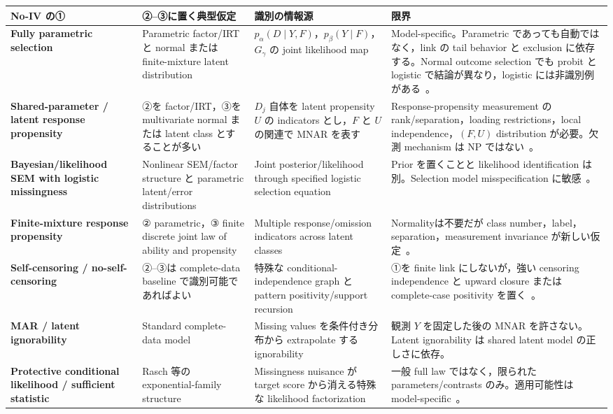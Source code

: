 \documentclass[11pt,a4paper]{ltjsarticle}
\theoremstyle{remark}
\begin{document}
\begin{center}
\footnotesize
\begin{tabularx}{0.99\textwidth}{>{\bfseries}p{32mm}p{37mm}p{42mm}X}
\toprule
No-IV の① & ②--③に置く典型仮定 & 識別の情報源 & 限界\\
\midrule
Fully parametric selection
& Parametric factor/IRT と normal または finite-mixture latent distribution
& $p_\alpha(D\mid Y,F)$，$p_\beta(Y\mid F)$，$G_\gamma$ の joint likelihood map
& Model-specific。Parametric であっても自動ではなく，link の tail behavior と exclusion に依存する。Normal outcome selection でも probit と logistic で結論が異なり，logistic には非識別例がある~\cite{MiaoDingGeng2016}。\\
\addlinespace
Shared-parameter / latent response propensity
& ②を factor/IRT，③を multivariate normal または latent class とすることが多い
& $D_j$ 自体を latent propensity $U$ の indicators とし，$F$ と $U$ の関連で MNAR を表す
& Response-propensity measurement の rank/separation，loading restrictions，local independence，$(F,U)$ distribution が必要。欠測 mechanism は NP ではない~\cite{MuthenKaplanHollis1987,HolmanGlas2005,RoseVonDavierXu2010,RoseVonDavierNagengast2017,KuhaKatsikatsouMoustaki2018}。\\
\addlinespace
Bayesian/likelihood SEM with logistic missingness
& Nonlinear SEM/factor structure と parametric latent/error distributions
& Joint posterior/likelihood through specified logistic selection equation
& Prior を置くことと likelihood identification は別。Selection model misspecification に敏感~\cite{Lee2006}。\\
\addlinespace
Finite-mixture response propensity
& ② parametric，③ finite discrete joint law of ability and propensity
& Multiple response/omission indicators across latent classes
& Normalityは不要だが class number，label，separation，measurement invariance が新しい仮定~\cite{BacciBartolucci2015}。\\
\addlinespace
Self-censoring / no-self-censoring
& ②--③は complete-data baseline で識別可能であればよい
& 特殊な conditional-independence graph と pattern positivity/support recursion
& ①を finite link にしないが，強い censoring independence と upward closure または complete-case positivity を置く~\cite{LiMiaoShpitserTT2023,Malinsky2022}。\\
\addlinespace
MAR / latent ignorability
& Standard complete-data model
& Missing values を条件付き分布から extrapolate する ignorability
& 観測 $Y$ を固定した後の MNAR を許さない。Latent ignorability は shared latent model の正しさに依存。\\
\addlinespace
Protective conditional likelihood / sufficient statistic
& Rasch 等の exponential-family structure
& Missingness nuisance が target score から消える特殊な likelihood factorization
& 一般 full law ではなく，限られた parameters/contrasts のみ。適用可能性は model-specific~\cite{RabeHeskethSkrondal2023}。\\
\bottomrule
\end{tabularx}
\end{center}
\end{document}
